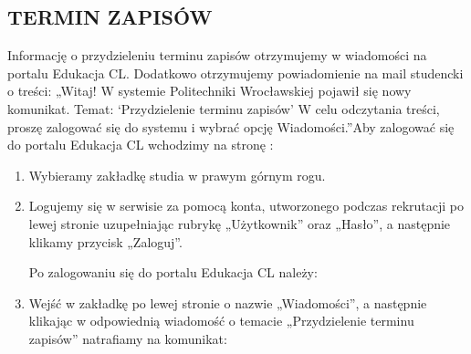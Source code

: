 \documentclass[11pt]{article}
\begin{document}
\subsection{TERMIN ZAPISÓW}
\indent \hspace{0.5cm} Informację o przydzieleniu terminu zapisów otrzymujemy w wiadomości na portalu Edukacja CL. Dodatkowo otrzymujemy powiadomienie na mail studencki o treści: „Witaj! W systemie Politechniki Wrocławskiej pojawił się nowy komunikat. Temat: ‘Przydzielenie terminu zapisów' W celu odczytania treści, proszę zalogować się do systemu i wybrać opcję Wiadomości.”\linebreak Aby zalogować się do portalu Edukacja CL wchodzimy na stronę {}:
\begin{enumerate}
    \item Wybieramy zakładkę studia w prawym górnym rogu.
    \item Logujemy się w serwisie za pomocą konta, utworzonego podczas rekrutacji po lewej stronie uzupełniając rubrykę „Użytkownik” oraz „Hasło”, a następnie klikamy przycisk „Zaloguj”.\\
    

\vspace{0.1cm}

\indent \hspace{0.5cm} Po zalogowaniu się do portalu Edukacja CL należy:
\item Wejść w zakładkę po lewej stronie o nazwie „Wiadomości”, a następnie klikając w odpowiednią wiadomość o temacie „Przydzielenie terminu zapisów” natrafiamy na komunikat: \\



\end{enumerate}
\end{document}
